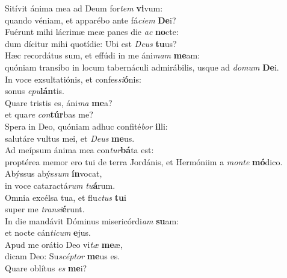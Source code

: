 \evenverse Sitívit ánima mea ad Deum for\textit{tem} \textbf{vi}vum:~\*\\
\evenverse quando véniam, et apparébo ante fá\textit{ci}\textit{em} \textbf{De}i?\\
\oddverse Fuérunt mihi lácrimæ meæ panes die \textit{ac} \textbf{no}cte:~\*\\
\oddverse dum dícitur mihi quotídie: Ubi est \textit{De}\textit{us} \textbf{tu}us?\\
\evenverse Hæc recordátus sum, et effúdi in me áni\textit{mam} \textbf{me}am:~\*\\
\evenverse quóniam transíbo in locum tabernáculi admirábilis, usque ad \textit{do}\textit{mum} \textbf{De}i.\\
\oddverse In voce exsultatiónis, et confes\textit{si}\textbf{ó}nis:~\*\\
\oddverse sonus \textit{e}\textit{pu}\textbf{lán}tis.\\
\evenverse Quare tristis es, áni\textit{ma} \textbf{me}a?~\*\\
\evenverse et qua\textit{re} \textit{con}\textbf{túr}bas me?\\
\oddverse Spera in Deo, quóniam adhuc confité\textit{bor} \textbf{il}li:~\*\\
\oddverse salutáre vultus mei, et \textit{De}\textit{us} \textbf{me}us.\\
\evenverse Ad meípsum ánima mea con\textit{tur}\textbf{bá}ta est:~\*\\
\evenverse proptérea memor ero tui de terra Jordánis, et Hermóniim a \textit{mon}\textit{te} \textbf{mó}dico.\\
\oddverse Abýssus abýs\textit{sum} \textbf{ín}vocat,~\*\\
\oddverse in voce cataractá\textit{rum} \textit{tu}\textbf{á}rum.\\
\evenverse Omnia excélsa tua, et flu\textit{ctus} \textbf{tu}i~\*\\
\evenverse super me \textit{tran}\textit{si}\textbf{é}runt.\\
\oddverse In die mandávit Dóminus misericórdi\textit{am} \textbf{su}am:~\*\\
\oddverse et nocte cán\textit{ti}\textit{cum} \textbf{e}jus.\\
\evenverse Apud me orátio Deo vi\textit{tæ} \textbf{me}æ,~\*\\
\evenverse dicam Deo: Su\textit{scép}\textit{tor} \textbf{me}us es.\\
\oddverse Quare oblítus \textit{es} \textbf{me}i?~\*\\
